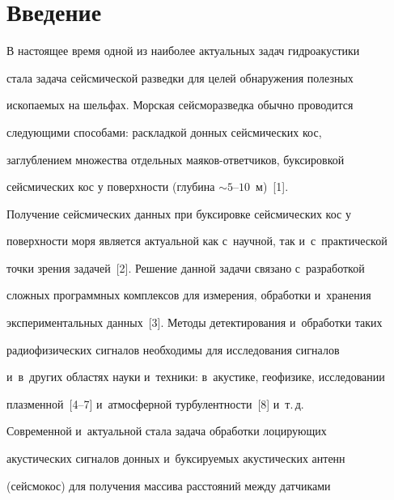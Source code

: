      







 \thispagestyle{headings}

 

 \vspace*{-18pt}

     

\section{Введение}



    В настоящее время одной из наиболее актуальных задач гидроакустики 

стала задача сейсмической разведки для целей обнаружения полезных 

ископаемых на шельфах. Морская сейсморазведка обычно проводится 

следующими способами: раскладкой донных сейсмических кос, 

заглублением множества отдельных маяков-ответчиков, буксировкой 

сейсмических кос у поверхности (глубина $\sim 5\mbox{--}10$~м)~[1]. 

Получение сейсмических данных при буксировке сейсмических кос у 

поверхности моря является актуальной как с~научной, так и~с~практической 

точки зрения задачей~[2]. Решение данной задачи связано с~разработкой 

сложных программных комплексов для измерения, обработки и~хранения 

экспериментальных данных~[3]. Методы детектирования и~обработки таких 

радиофизических сигналов необходимы для исследования сигналов 

и~в~других областях науки и~техники: в~акустике, геофизике, исследовании 

плазменной~[4--7] и~атмосферной турбулентности~[8] и~т.\,д.

    

    Современной и~актуальной стала задача обработки лоцирующих 

акустических сигналов донных и~буксируемых акустических антенн 

(сейсмокос) для получения массива расстояний между датчиками 

